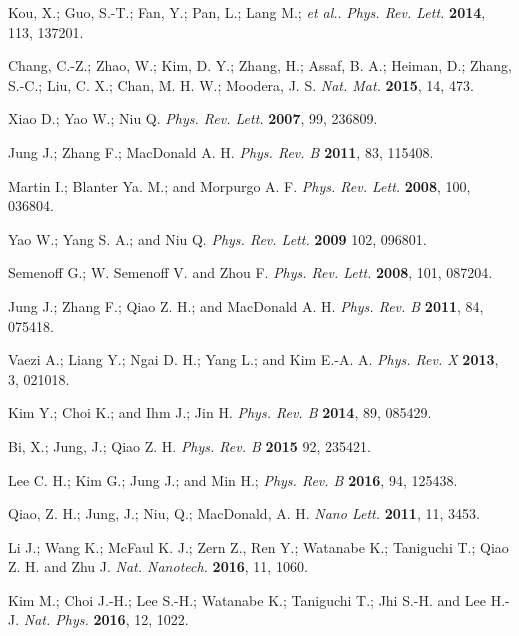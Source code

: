 \documentclass[journal=nalefd,manuscript=communication]{achemso}
\begin{document}
\begin{thebibliography}{99}
Kou, X.; Guo, S.-T.; Fan, Y.; Pan, L.; Lang M.; \textit{et al.}. \textit{Phys. Rev. Lett.} \textbf{2014}, 113, 137201.

Chang, C.-Z.; Zhao, W.; Kim, D. Y.; Zhang, H.; Assaf, B. A.; Heiman, D.; Zhang, S.-C.; Liu, C. X.; Chan, M. H. W.; Moodera, J. S. \textit{Nat. Mat.} \textbf{2015}, 14, 473.

Xiao D.; Yao W.; Niu Q. \textit{Phys. Rev. Lett.} \textbf{2007}, 99, 236809.
%


 Jung J.; Zhang F.; MacDonald A. H. \textit{Phys. Rev. B} \textbf{2011}, 83, 115408.

Martin I.;  Blanter Ya. M.; and  Morpurgo A. F. \textit{Phys. Rev. Lett.} \textbf{2008}, 100, 036804.

Yao W.; Yang S. A.; and Niu Q.  \textit{Phys. Rev. Lett.} \textbf{2009} 102, 096801.

Semenoff G.; W. Semenoff V. and Zhou F. \textit{Phys. Rev. Lett.} \textbf{2008}, 101, 087204.

Jung J.; Zhang F.; Qiao Z. H.; and MacDonald A. H. \textit{Phys. Rev. B} \textbf{2011}, 84, 075418.

Vaezi A.; Liang Y.; Ngai D. H.; Yang L.; and Kim E.-A. A. \textit{Phys. Rev. X} \textbf{2013}, 3, 021018.

Kim Y.; Choi K.; and Ihm J.; Jin H. \textit{Phys. Rev. B} \textbf{2014}, 89, 085429.

Bi, X.; Jung, J.; Qiao Z. H. \textit{Phys. Rev. B} \textbf{2015} 92, 235421.

Lee C. H.; Kim G.; Jung J.; and Min H.; \textit{Phys. Rev. B} \textbf{2016}, 94, 125438.

Qiao, Z. H.; Jung, J.; Niu, Q.; MacDonald, A. H. \textit{Nano Lett.} \textbf{2011}, 11, 3453.

Li J.; Wang K.; McFaul K. J.; Zern Z., Ren Y.; Watanabe K.; Taniguchi T.; Qiao Z. H. and Zhu J. \textit{Nat. Nanotech.} \textbf{2016}, 11, 1060.

Kim M.; Choi J.-H.; Lee S.-H.; Watanabe K.; Taniguchi T.; Jhi S.-H. and Lee H.-J. \textit{Nat. Phys.} \textbf{2016}, 12, 1022.


\end{thebibliography}
\end{document}
